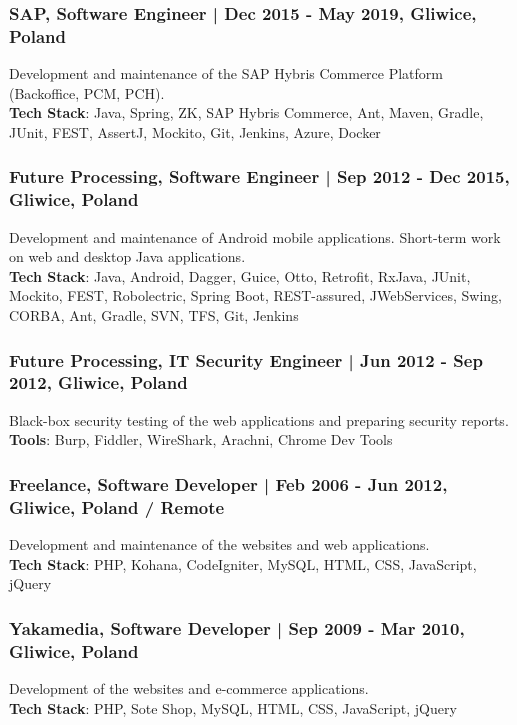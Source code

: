 \documentclass[8pt]{extarticle}
\begin{document}
      \subsubsection*{\normalsize{SAP, Software Engineer | Dec 2015 - May 2019, Gliwice, Poland}}
      Development and maintenance of the SAP Hybris Commerce Platform (Backoffice, PCM, PCH).\\
      \textbf{Tech Stack}: Java, Spring, ZK, SAP Hybris Commerce, Ant, Maven, Gradle,
      JUnit, FEST, AssertJ, Mockito, Git, Jenkins, Azure, Docker

      \subsubsection*{\normalsize{Future Processing, Software Engineer | Sep 2012 - Dec 2015, Gliwice, Poland}}
      Development and maintenance of Android mobile applications. Short-term work on web and desktop Java applications.\\
      \textbf{Tech Stack}: Java, Android, Dagger, Guice, Otto, Retrofit, RxJava,
      JUnit, Mockito, FEST, Robolectric, Spring Boot, REST-assured, JWebServices,
      Swing, CORBA, Ant, Gradle, SVN, TFS, Git, Jenkins

      \subsubsection*{\normalsize{Future Processing, IT Security Engineer | Jun 2012 - Sep 2012, Gliwice, Poland}}
      Black-box security testing of the web applications and preparing security reports.\\
      \textbf{Tools}: Burp, Fiddler, WireShark, Arachni, Chrome Dev Tools

      \subsubsection*{\normalsize{Freelance, Software Developer | Feb 2006 - Jun 2012, Gliwice, Poland / Remote}}
      Development and maintenance of the websites and web applications.\\
      \textbf{Tech Stack}: PHP, Kohana, CodeIgniter, MySQL, HTML, CSS, JavaScript, jQuery

      \subsubsection*{\normalsize{Yakamedia, Software Developer | Sep 2009 - Mar 2010, Gliwice, Poland}}
      Development of the websites and e-commerce applications.\\
      \textbf{Tech Stack}: PHP, Sote Shop, MySQL, HTML, CSS, JavaScript, jQuery
\end{document}

